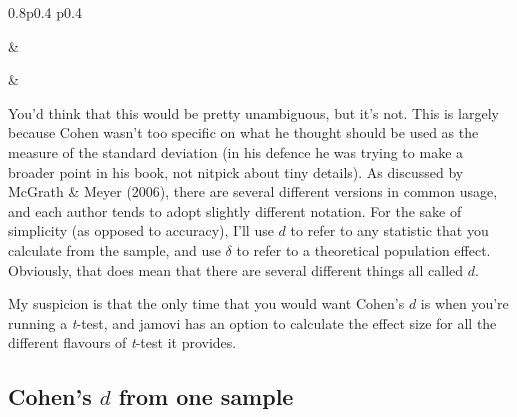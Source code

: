 \documentclass[
  a4paper,
]{book}
\begin{document}
\begin{table}[ht]
\begin{centerbox}
\begin{tabularx}{0.8\textwidth}{p{} p{}}
\hhline{}

 &
 \tabularnewline[-0.5pt]


\hhline{}

 &
 \tabularnewline[-0.5pt]


\end{tabularx}\par\end{centerbox}
 

\end{table}
 

You'd think that this would be pretty unambiguous, but it's not. This is
largely because Cohen wasn't too specific on what he thought should be
used as the measure of the standard deviation (in his defence he was
trying to make a broader point in his book, not nitpick about tiny
details). As discussed by McGrath \& Meyer (2006), there are several
different versions in common usage, and each author tends to adopt
slightly different notation. For the sake of simplicity (as opposed to
accuracy), I'll use \(d\) to refer to any statistic that you calculate
from the sample, and use \(\delta\) to refer to a theoretical population
effect. Obviously, that does mean that there are several different
things all called \(d\).

My suspicion is that the only time that you would want Cohen's \(d\) is
when you're running a \emph{t}-test, and jamovi has an option to
calculate the effect size for all the different flavours of
\emph{t}-test it provides.

\hypertarget{cohens-d-from-one-sample}{%
\subsection{\texorpdfstring{Cohen's \(d\) from one
sample}{Cohen's d from one sample}}\label{cohens-d-from-one-sample}}
\end{document}
